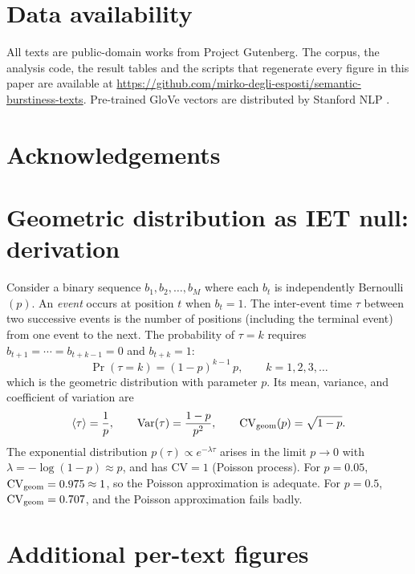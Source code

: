 \documentclass[12pt,a4paper]{article}
\newcommand{\meantau}{\langle\tau\rangle}
\newcommand{\CV}{\mathrm{CV}}
\begin{document}
\section*{Data availability}
All texts are public-domain works from Project Gutenberg. The corpus,
the analysis code, the result tables and the scripts that regenerate
every figure in this paper are available at
\url{https://github.com/mirko-degli-esposti/semantic-burstiness-texts}.
Pre-trained GloVe vectors are distributed by Stanford NLP
\citep{Pennington2014}.


\section*{Acknowledgements}
\appendix

\section{Geometric distribution as IET null: derivation}
\label{app:geometric}

Consider a binary sequence $b_1, b_2, \ldots, b_M$ where each $b_t$
is independently Bernoulli$(p)$.
An \emph{event} occurs at position $t$ when $b_t = 1$.
The inter-event time $\tau$ between two successive events is the number
of positions (including the terminal event) from one event to the next.
The probability of $\tau = k$ requires $b_{t+1} = \cdots = b_{t+k-1}
= 0$ and $b_{t+k} = 1$:
\begin{equation}
  \Pr(\tau = k) = (1-p)^{k-1}\,p, \qquad k = 1, 2, 3, \ldots
\end{equation}
which is the geometric distribution with parameter $p$.
Its mean, variance, and coefficient of variation are
\begin{equation}
  \meantau = \frac{1}{p},
  \qquad
  \mathrm{Var}(\tau) = \frac{1-p}{p^2},
  \qquad
  \CV_{\rm geom}(p) = \sqrt{1-p}.
\end{equation}
The exponential distribution $p(\tau) \propto e^{-\lambda\tau}$ arises
in the limit $p \to 0$ with $\lambda = -\log(1-p) \approx p$, and has
$\CV = 1$ (Poisson process).
For $p = 0.05$, $\CV_{\rm geom} = 0.975 \approx 1$, so the Poisson
approximation is adequate.
For $p = 0.5$, $\CV_{\rm geom} = 0.707$, and the Poisson
approximation fails badly.

\section{Additional per-text figures}
\label{app:pertext}
\end{document}
